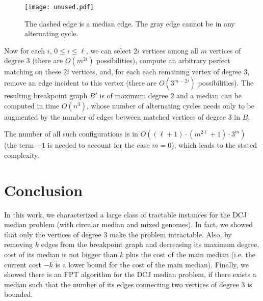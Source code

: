 \documentclass[10pt]{llncs}
\begin{document}
\begin{figure} 
  \begin{center}
    \texttt{[image: unused.pdf]}
    \caption{The dashed edge is a median edge. The gray edge cannot be
      in any alternating cycle.}
    \label{3edge}
  \end{center}
\end{figure}

Now for each $i$, $0 \leq i \leq \ell$, we can select $2i$ vertices
among all $m$ vertices of degree $3$ (there are $O(m^{2i})$
possibilities), compute an arbitrary perfect matching on these $2i$
vertices, and, for each each remaining vertex of degree $3$, remove an
edge incident to this vertex (there are $O(3^{m-{2i}})$
possibilities). The resulting breakpoint graph $B'$ is of maximum
degree $2$ and a median can be computed in time $O(n^3)$, whose number
of alternating cycles needs only to be augmented by the number of
edges between matched vertices of degree $3$ in $B$. 

The number of all such configurations is in
$O((\ell+1) \cdot (m^{2\ell}+1) \cdot 3^m)$ (the term $+1$ is needed to
account for the case $m=0$), which leads to the stated complexity.




























 










\section{Conclusion}

In this work, we characterized a large class of tractable instances
for the DCJ median problem (with circular median and mixed
genomes). In fact, we showed that only the vertices of degree $3$ make
the problem intractable. Also, by removing $k$ edges from the
breakpoint graph and decreasing its maximum degree, cost of its median
is not bigger than $k$ plus the cost of the main median (i.e. the
current cost $ - k$ is a lower bound for the cost of the main median).
Finally, we showed there is an FPT algorithm for the DCJ median
problem, if there exists a median such that the number of its edges
connecting two vertices of degree $3$ is bounded.
\end{document}
